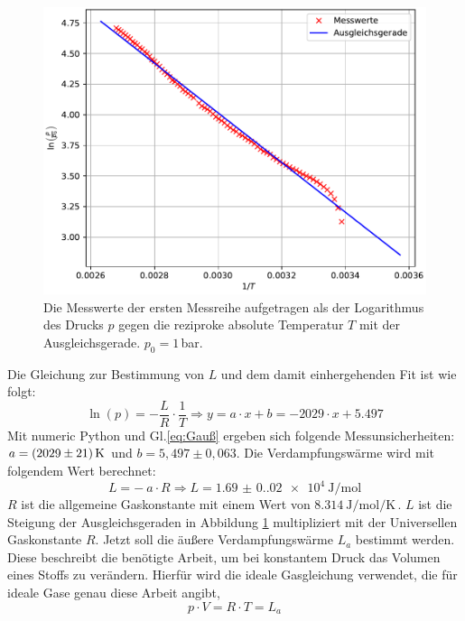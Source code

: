 \begin{figure}[H]
  \centering
  \includegraphics[scale=0.8]{plotc.pdf}
  \caption{Die Messwerte der ersten Messreihe aufgetragen als der Logarithmus des Drucks $p$
  gegen die reziproke absolute Temperatur $T$ mit der Ausgleichsgerade. $p_0=1$\,bar.}
  \label{fig:Ausgleichsgerade}
\end{figure}\noindent
Die Gleichung zur Bestimmung von $L$ und dem damit einhergehenden Fit ist wie folgt:
\begin{equation}
  \ln(p) = - \frac{L}{R} \cdot \frac{1}{T}
  \Rightarrow y = a \cdot x + b = -2029 \cdot x + 5.497
\end{equation}
Mit numeric Python und Gl.\eqref{eq:Gauß} ergeben sich folgende Messunsicherheiten: $a = \SI{2029 +- 21}{\kelvin}$
und $b = 5,497\pm0,063$.
Die Verdampfungswärme wird mit folgendem Wert berechnet:
\begin{equation*}
  L = - \ a \cdot R \Rightarrow L = \SI{1.69(0.02)e4}{\joule\per\mol}
\end{equation*}
$R$ ist die allgemeine Gaskonstante mit einem Wert von $\SI{8.314}{\joule\per\mole\per\kelvin}$\,\cite{Gaskonstante}.
$L$ ist die Steigung der Ausgleichsgeraden in Abbildung \ref{fig:Ausgleichsgerade} multipliziert mit der Universellen Gaskonstante $R$.
\noindent
Jetzt soll die äußere Verdampfungswärme $L_a$ bestimmt werden.
Diese beschreibt die benötigte Arbeit, um bei konstantem Druck das Volumen eines Stoffs zu verändern.
Hierfür wird die ideale Gasgleichung verwendet, die für ideale Gase genau diese Arbeit angibt,
\begin{equation}
    p \cdot V = R \cdot T = L_a
\end{equation}
